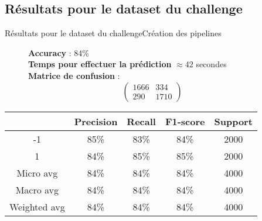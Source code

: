 \documentclass[usenames,dvipsnames]{beamer}
\begin{document}
\subsection{Résultats pour le dataset du challenge}
\begin{frame}{Résultats pour le dataset du challenge}{Création des pipelines}
\begin{figure}[!ht]
  \centering
  \textbf{Accuracy} : 84\% \\
  \textbf{Temps pour effectuer la prédiction} $\approx42$ secondes \\
  \textbf{Matrice de confusion} :
  $$
  \begin{pmatrix}
  1666 & 334 \\
  290 & 1710
  \end{pmatrix}
  $$
\end{figure}

\begin{table}
  \centering
  \begin{tabular}{|c||c|c|c|c|}
    \hline
     & \textbf{Precision} & \textbf{Recall} & \textbf{F1-score} & \textbf{Support}\\
    \hline
    \hline
    -1 & 85\% & 83\% & 84\% & 2000\\
    \hline
    1 & 84\% & 85\% & 85\% & 2000\\
    \hline
    Micro avg & 84\% & 84\% & 84\% & 4000\\
    \hline
    Macro avg & 84\% & 84\% & 84\% & 4000\\
    \hline
    Weighted avg & 84\% & 84\% & 84\% & 4000\\
    \hline
  \end{tabular}
\end{table}
\end{frame}
\end{document}
